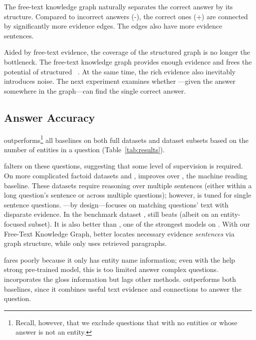 The free-text knowledge graph naturally separates the correct answer by its structure.
%
Compared to incorrect answers (-), the correct ones (+) are connected by significantly more evidence edges.
%
The edges also have more evidence sentences.

Aided by free-text evidence, the coverage of the structured graph is
no longer the bottleneck.
%
The free-text knowledge graph provides enough evidence and frees the
potential of structured ~.
%
At the same time, the rich evidence also inevitably introduces noise.
%
The next experiment examines whether \name{}---given the answer
somewhere in the graph---can find the single correct answer.






\subsection{Answer Accuracy}
\name{} outperforms\footnote{Recall, however, that we exclude
  questions that with no entities or whose answer is not an entity.}
all baselines on both full datasets and dataset subsets based on the
number of entities in a question (Table~\ref{tab:results}).

\quest{} falters on these questions, suggesting that some level of
supervision is required.
%
On more complicated factoid  datasets \qblink{} and \qanta{},
\name{} improves over \drqa{}, 
the machine reading  baseline.
%
These datasets require reasoning over multiple sentences (either
within a long question's sentence or across multiple questions); however,
\drqa{} is tuned for single sentence questions.
%
\name{}---by design---focuses on matching questions' text with
disparate evidence.
%
In the  benchmark dataset \triviaqa{}, \name{} still beats
\drqa{} (albeit on an entity-focused subset).
%
It is also better than \docqa{}, one of the strongest models
on \triviaqa{}.
%
With our Free-Text Knowledge Graph, \name{} better locates 
necessary evidence \emph{sentences} via graph structure, while
 only uses retrieved paragraphs.

\bertet{} fares poorly because it only has entity name information; even
with the help strong pre-trained model, this is 
too limited answer complex questions.
%
\bertsent{} incorporates the gloss information but lags other methods.
%
\name{} outperforms both baselines, since it combines useful
text evidence and  connections to answer
the question.

